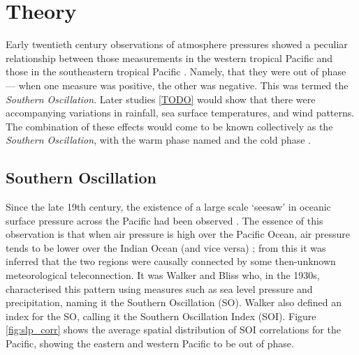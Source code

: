 \section{Theory}
\label{sec:theory}

Early twentieth century observations of atmosphere pressures showed a peculiar
relationship between those measurements in the western tropical Pacific and
those in the southeastern tropical Pacific \citep{holton1989}. Namely, that they
were out of phase --- when one measure was positive, the other was negative.
This was termed the \emph{Southern Oscillation}. Later studies \ref{TODO} would
show that there were accompanying variations in rainfall, sea surface
temperatures, and wind patterns. The combination of these effects would come to
be known collectively as the \elnino{} \emph{Southern Oscillation}, with the
warm phase named \elnino{} and the cold phase \nina{}.


\subsection{Southern Oscillation}
Since the late 19th century, the existence of a large scale `seesaw' in oceanic
surface pressure across the Pacific had been observed \citep{trenberth2000}. The
essence of this observation is that when air pressure is high over the Pacific
Ocean, air pressure tends to be lower over the Indian Ocean (and vice versa)
\citep{philander1990}; from this it was inferred that the two regions were
causally connected by some then-unknown meteorological teleconnection. It was
Walker and Bliss who, in the 1930s, characterised this pattern using measures
such as sea level pressure and precipitation, naming it the Southern Oscillation
(SO). Walker also defined an index for the SO, calling it the Southern
Oscillation Index (SOI). Figure \ref{fig:slp_corr} shows the average spatial
distribution of SOI correlations for the Pacific, showing the eastern and
western Pacific to be out of phase.

